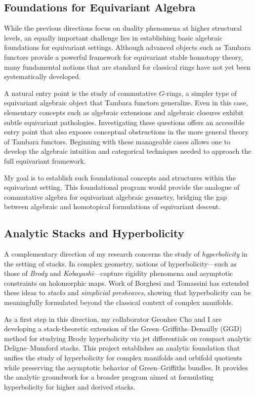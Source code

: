 \documentclass[11pt]{article}
\begin{document}
\subsection*{Foundations for Equivariant Algebra}
While the previous directions focus on duality phenomena at higher structural levels, an equally important challenge lies in establishing basic algebraic foundations for equivariant settings.
Although advanced objects such as Tambara functors provide a powerful framework for equivariant stable homotopy theory, many fundamental notions that are standard for classical rings have not yet been systematically developed.

A natural entry point is the study of commutative $G$-rings, a simpler type of equivariant algebraic object that Tambara functors generalize.
Even in this case, elementary concepts such as algebraic extensions and algebraic closures exhibit subtle equivariant pathologies.
Investigating these questions offers an accessible entry point that also exposes conceptual obstructions in the more general theory of Tambara functors.
Beginning with these manageable cases allows one to develop the algebraic intuition and categorical techniques needed to approach the full equivariant framework.

My goal is to establish such foundational concepts and structures within the equivariant setting.
This foundational program would provide the analogue of commutative algebra for equivariant algebraic geometry, bridging the gap between algebraic and homotopical formulations of equivariant descent.


\subsection*{Analytic Stacks and Hyperbolicity}
A complementary direction of my research concerns the study of {\it hyperbolicity} in the setting of stacks.
In complex geometry, notions of hyperbolicity—such as those of {\it Brody} and {\it Kobayashi}—capture rigidity phenomena and asymptotic constraints on holomorphic maps.
Work of Borghesi and Tomassini \cite{MR3673667} has extended these ideas to {\it stacks} and {\it simplicial presheaves}, showing that hyperbolicity can be meaningfully formulated beyond the classical context of complex manifolds.

As a first step in this direction, my collaborator Geonhee Cho and I are developing a stack-theoretic extension of the Green–Griffiths–Demailly (GGD) method for studying Brody hyperbolicity via jet differentials on compact analytic Deligne–Mumford stacks.
This project establishes an analytic foundation that unifies the study of hyperbolicity for complex manifolds and orbifold quotients while preserving the asymptotic behavior of Green–Griffiths bundles.
It provides the analytic groundwork for a broader program aimed at formulating hyperbolicity for higher and derived stacks.
\end{document}
